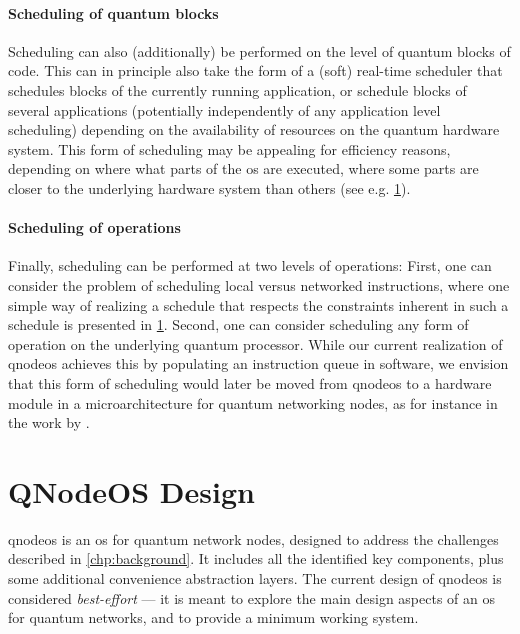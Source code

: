 \paragraph{Scheduling of quantum blocks}

Scheduling can also (additionally) be performed on the level of quantum blocks of code. This can in
principle also take the form of a (soft) real-time scheduler that schedules blocks of the currently
running application, or schedule blocks of several applications (potentially independently of any
application level scheduling) depending on the availability of resources on the quantum hardware
system. This form of scheduling may be appealing for efficiency reasons, depending on where what
parts of the \acrshort{os} are executed, where some parts are closer to the underlying hardware
system than others (see e.g. \cref{sec:arch:design}).

\paragraph{Scheduling of operations}

Finally, scheduling can be performed at two levels of operations: First, one can consider the
problem of scheduling local versus networked instructions, where one simple way of realizing a
schedule that respects the constraints inherent in such a schedule is presented in
\cref{sec:arch:design}. Second, one can consider scheduling any form of operation on the underlying
quantum processor. While our current realization of \acrshort{qnodeos} achieves this by populating
an instruction queue in software, we envision that this form of scheduling would later be moved from
\acrshort{qnodeos} to a hardware module in a microarchitecture for quantum networking nodes, as for
instance in the work by \textcite{fu_2017_microarch}.

\section{QNodeOS Design}
\label{sec:arch:design}

\acrshort{qnodeos} is an \acrshort{os} for quantum network nodes, designed to address the challenges
described in \cref{chp:background}. It includes all the identified key components, plus some
additional convenience abstraction layers. The current design of \acrshort{qnodeos} is considered
\emph{best-effort} --- it is meant to explore the main design aspects of an \acrshort{os} for
quantum networks, and to provide a minimum working system.

